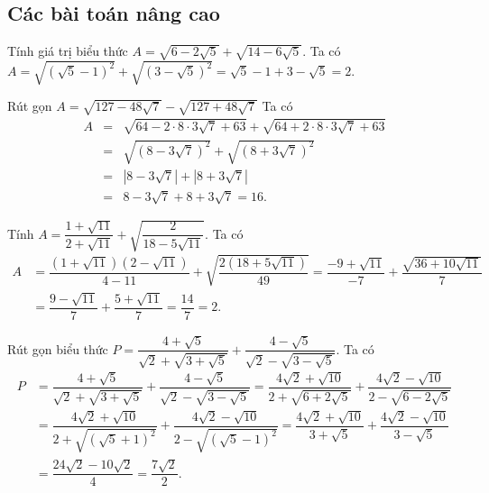 \subsection{Các bài toán nâng cao}

\begin{bt}%
	Tính giá trị biểu thức $A=\sqrt{6-2\sqrt{5}}+\sqrt{14-6\sqrt{5}}$.
	\loigiai
	{
		Ta có $A=\sqrt{\left(\sqrt{5}-1\right)^2}+\sqrt{\left(3-\sqrt{5}\right)^2}=\sqrt{5}-1+3-\sqrt{5}=2$.
	}
\end{bt}

\begin{bt}%
	Rút gọn $A=\sqrt{127-48\sqrt{7}}-\sqrt{127+48\sqrt{7}}$
	\loigiai
	{
		Ta có
		\allowdisplaybreaks
		\begin{eqnarray*}
			A&=&\sqrt{64-2\cdot 8 \cdot 3\sqrt{7}+63}+\sqrt{64+2\cdot 8\cdot 3\sqrt{7}+63}\\
			&=&\sqrt{(8-3\sqrt{7})^2}+\sqrt{(8+3\sqrt{7})^2}\\
			&=&\left| 8-3\sqrt{7}\right| +\left| 8+3\sqrt{7}\right|\\
			&=& 8-3\sqrt{7}+8+3\sqrt{7}=16.
		\end{eqnarray*}
	}
\end{bt}

\begin{bt}%
	Tính $A=\dfrac{1+\sqrt{11}}{2+\sqrt{11}}+\sqrt{\dfrac{2}{18-5\sqrt{11}}}$.
	\loigiai
	{
		Ta có
		\allowdisplaybreaks
		\begin{align*}
		A &=\dfrac{(1+\sqrt{11})(2-\sqrt{11})}{4-11}+\sqrt{\dfrac{2(18+5\sqrt{11})}{49}}
		=\dfrac{-9+\sqrt{11}}{-7}+\dfrac{\sqrt{36+10\sqrt{11}}}{7}\\
		&=\dfrac{9-\sqrt{11}}{7}+\dfrac{5+\sqrt{11}}{7}
		=\dfrac{14}{7}=2.
		\end{align*}
	}
\end{bt}

\begin{bt}%
	Rút gọn biểu thức $P = \dfrac{4+\sqrt{5}}{\sqrt{2}+\sqrt{3+\sqrt{5}}} + \dfrac{4-\sqrt{5}}{\sqrt{2} - \sqrt{3-\sqrt{5}}}$.
	\loigiai 
	{
		Ta có
		\allowdisplaybreaks
		\begin{align*}
		P &= \dfrac{4+\sqrt{5}}{\sqrt{2}+\sqrt{3+\sqrt{5}}} + \dfrac{4-\sqrt{5}}{\sqrt{2} - \sqrt{3-\sqrt{5}}}
		= \dfrac{4\sqrt{2}+\sqrt{10}}{2+\sqrt{6+2\sqrt{5}}} + \dfrac{4\sqrt{2}-\sqrt{10}}{2 - \sqrt{6-2\sqrt{5}}}\\
		&= \dfrac{4\sqrt{2}+\sqrt{10}}{2+\sqrt{(\sqrt{5}+1)^2}} + \dfrac{4\sqrt{2}-\sqrt{10}}{2 - \sqrt{(\sqrt{5}-1)^2}}
		= \dfrac{4\sqrt{2}+\sqrt{10}}{3+\sqrt{5}} + \dfrac{4\sqrt{2}-\sqrt{10}}{3-\sqrt{5}}\\
		&= \dfrac{24\sqrt{2} - 10\sqrt{2}}{4} = \dfrac{7\sqrt{2}}{2}.
		\end{align*}
	}
\end{bt}

